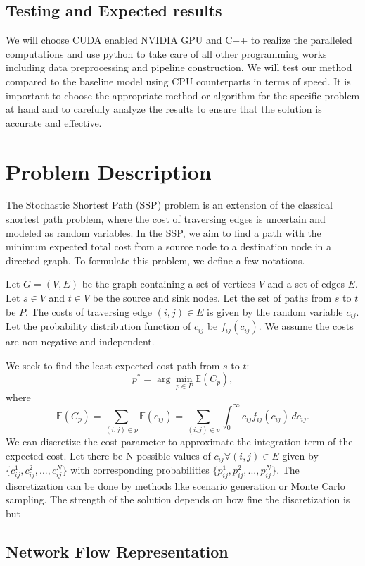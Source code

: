 \documentclass{article}
\begin{document}
\subsection{Testing and Expected results}

We will choose CUDA enabled NVIDIA GPU and C++ to realize the paralleled computations and use python 
to take care of all other programming works including data preprocessing and pipeline construction. 
We will test our method compared to the baseline model using CPU counterparts in terms of speed. 
It is important to choose the appropriate method or algorithm for the specific problem at hand and to 
carefully analyze the results to ensure that the solution is accurate and effective. 

\section{Problem Description}
The Stochastic Shortest Path (SSP) problem is an extension of the classical shortest path problem, where the cost of traversing edges is uncertain and modeled as random variables. In the SSP, we aim to find a path with the minimum expected total cost from a source node to a destination node in a directed graph. To formulate this problem, we define a few notations.

Let $G=(V,E)$ be the graph containing a set of vertices $V$ and a set of edges $E$. Let $s \in V$ and $t \in V$ be the source and sink nodes. Let the set of paths from $s$ to $t$ be $P$. The costs of traversing edge $(i,j) \in E$ is given by the random variable $c_{ij}$. Let the probability distribution function of $c_{ij}$ be $f_{ij}(c_{ij})$. We assume the costs are non-negative and independent. 

We seek to find the least expected cost path from $s$ to $t$:
\[p^* = \arg \min_{p \in P} \mathbb{E}(C_p),\] 
where \[\mathbb{E}(C_p) = \sum_{(i,j) \in p}\mathbb{E} (c_{ij})= \sum_{(i,j) \in p} \int_{0}^\infty c_{ij} f_{ij}(c_{ij}) \, dc_{ij}.\]
We can discretize the cost parameter to approximate the integration term of the expected cost. Let there be N possible values of $c_{ij} \forall (i,j) \in E$ given by $\{ c_{ij}^1, c_{ij}^2, ..., c_{ij}^N\}$ with corresponding probabilities $\{ p_{ij}^1, p_{ij}^2, ..., p_{ij}^N\}$. The discretization can be done by methods like scenario generation or Monte Carlo sampling. The strength of the solution depends on how fine the discretization is but

\subsection{Network Flow Representation}
\end{document}
